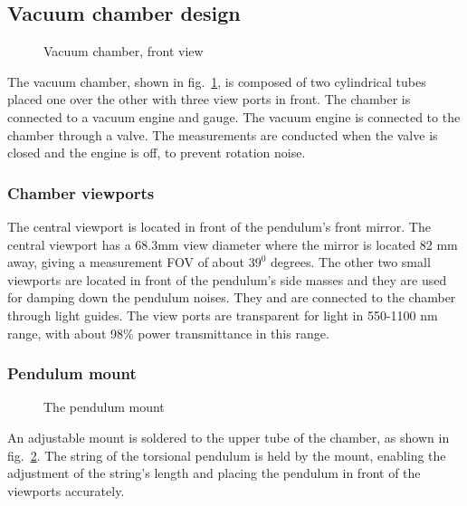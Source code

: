 \documentclass[\main/master.tex]{subfiles}
\begin{document}
\subsection{Vacuum chamber design}
\begin{figure}[htbp]
	\centering
	\caption[Vacuum chamber, front view]{Vacuum chamber, front view}
	\label{fig:chamber front}
\end{figure}
\FloatBarrier

\par\noindent
The vacuum chamber, shown in fig.~\ref{fig:chamber front}, is composed of two cylindrical tubes placed one over the other with three view ports in front. The chamber is connected to a vacuum engine and gauge. The vacuum engine is connected to the chamber through a valve. The measurements are conducted when the valve is closed and the engine is off, to prevent rotation noise.

\subsubsection{Chamber viewports}
\par\noindent
The central viewport is located in front of the pendulum's front mirror. The central viewport has a 68.3mm view diameter where the mirror is located 82 mm away, giving a measurement FOV of about $39^0$ degrees. The other two small viewports are located in front of the pendulum's side masses and they are used for damping down the pendulum noises. They and are connected to the chamber through light guides. The view ports are transparent for light in 550-1100 nm range, with about 98$\%$ power transmittance in this range. 

\subsubsection{Pendulum mount}
\begin{figure}[htbp]
	\centering
	\caption[The pendulum mount]{The pendulum mount}
	\label{fig:mount}
\end{figure}
\FloatBarrier
\par\noindent
An adjustable mount is soldered to the upper tube of the chamber, as shown in fig.~\ref{fig:mount}. The string of the torsional pendulum is held by the mount, enabling the adjustment of the string's length and placing the pendulum in front of the viewports accurately. 
\end{document}
